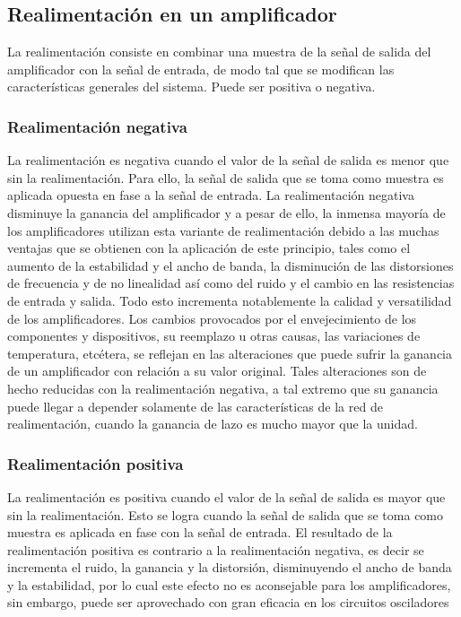 \subsection{Realimentación en un amplificador}

La realimentación consiste en combinar una muestra de la señal de salida del amplificador
con la señal de entrada, de modo tal que se modifican las características generales del
sistema. Puede ser positiva o negativa.

\subsubsection{Realimentación negativa}

La realimentación es negativa cuando el valor de la señal de salida es menor que sin la
realimentación. Para ello, la señal de salida que se toma como muestra es aplicada opuesta
en fase a la señal de entrada.
La realimentación negativa disminuye la ganancia del amplificador y a pesar de ello, la
inmensa mayoría de los amplificadores utilizan esta variante de realimentación debido a las
muchas ventajas que se obtienen con la aplicación de este principio, tales como el aumento
de la estabilidad y el ancho de banda, la disminución de las distorsiones de frecuencia y de
no linealidad así como del ruido y el cambio en las resistencias de entrada y salida. Todo
esto incrementa notablemente la calidad y versatilidad de los amplificadores.
Los cambios provocados por el envejecimiento de los componentes y dispositivos, su
reemplazo u otras causas, las variaciones de temperatura, etcétera, se reflejan en las alteraciones que puede sufrir la ganancia de un amplificador con relación a su valor original. Tales
alteraciones son de hecho reducidas con la realimentación negativa, a tal extremo que su ganancia puede llegar a depender solamente de las características de la red de realimentación,
cuando la ganancia de lazo es mucho mayor que la unidad.

\subsubsection{Realimentación positiva}

La realimentación es positiva cuando el valor de la señal de salida es mayor que sin
la realimentación. Esto se logra cuando la señal de salida que se toma como muestra es
aplicada en fase con la señal de entrada.
El resultado de la realimentación positiva es contrario a la realimentación negativa, es
decir se incrementa el ruido, la ganancia y la distorsión, disminuyendo el ancho de banda y
la estabilidad, por lo cual este efecto no es aconsejable para los amplificadores, sin embargo,
puede ser aprovechado con gran eficacia en los circuitos osciladores
